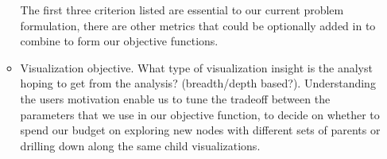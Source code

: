 \begin{enumerate}
\begin{itemize}
\begin{itemize}
  \end{itemize}
The first three criterion listed are essential to our current problem formulation, there are other metrics that could be optionally added in to combine to form our objective functions.
\item Visualization objective. What type of visualization insight is the analyst hoping to get from the analysis? (breadth/depth based?). Understanding the users motivation enable us to tune the tradeoff between the parameters that we use in our objective function, to decide on whether to spend our budget on exploring new nodes with different sets of parents or drilling down along the same child visualizations.
\end{itemize}

\end{enumerate}
 
    